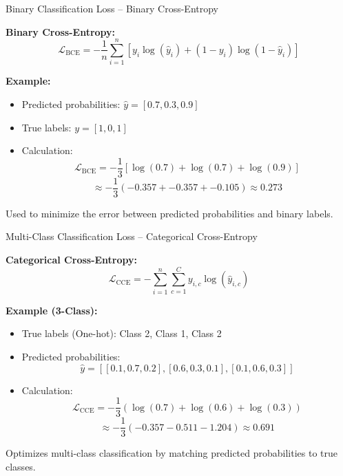 \documentclass[serif, aspectratio=169]{beamer}
\begin{document}
\begin{frame}{Binary Classification Loss – Binary Cross-Entropy}

    \textbf{Binary Cross-Entropy:}
    \[
    \mathcal{L}_{\text{BCE}} = -\frac{1}{n} \sum_{i=1}^{n} \left[ y_i \log(\hat{y}_i) + (1 - y_i) \log(1 - \hat{y}_i) \right]
    \]

    \textbf{Example:}
    \begin{itemize}
        \item Predicted probabilities: \( \hat{y} = [0.7, 0.3, 0.9] \)
        \item True labels: \( y = [1, 0, 1] \)
        \item Calculation:
        \[
        \mathcal{L}_{\text{BCE}} = -\frac{1}{3} \left[ \log(0.7) + \log(0.7) + \log(0.9) \right]
        \]
        \[
        \approx -\frac{1}{3} \left( -0.357 + -0.357 + -0.105 \right) \approx 0.273
        \]
    \end{itemize}
    Used to minimize the error between predicted probabilities and binary labels.
    
\end{frame}

\begin{frame}{Multi-Class Classification Loss – Categorical Cross-Entropy}

    \textbf{Categorical Cross-Entropy:}
    \[
    \mathcal{L}_{\text{CCE}} = -\sum_{i=1}^{n} \sum_{c=1}^{C} y_{i,c} \log(\hat{y}_{i,c})
    \]

    \textbf{Example (3-Class):}
    \begin{itemize}
        \item True labels (One-hot): Class 2, Class 1, Class 2
        \item Predicted probabilities:
        \[
        \hat{y} = \left[ [0.1, 0.7, 0.2], [0.6, 0.3, 0.1], [0.1, 0.6, 0.3] \right]
        \]
        \item Calculation:
        \[
        \mathcal{L}_{\text{CCE}} = -\frac{1}{3} \left( \log(0.7) + \log(0.6) + \log(0.3) \right)
        \]
        \[
        \approx -\frac{1}{3} (-0.357 - 0.511 - 1.204) \approx 0.691
        \]
    \end{itemize}
    Optimizes multi-class classification by matching predicted probabilities to true classes.
    
\end{frame}


    
\end{document}
